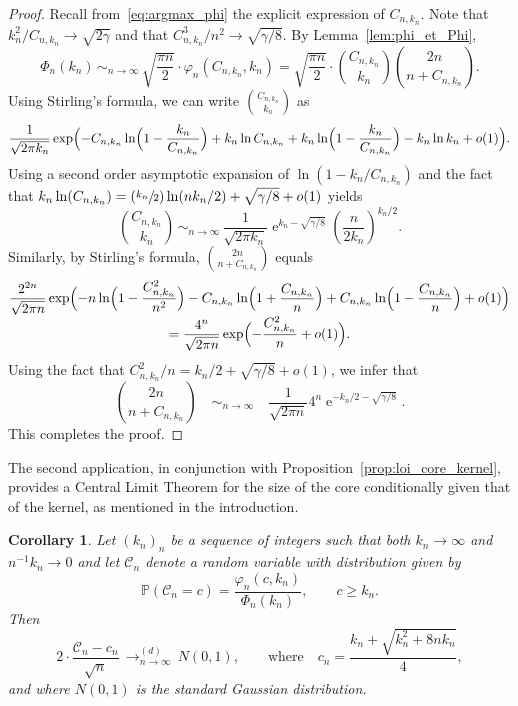 \documentclass[10pt]{amsart}
\newcommand{\Psfrac}[2]{(\sfrac{#1}{#2})}
\theoremstyle{plain}
\newtheorem{corollary}[theorem]{Corollary}
\theoremstyle{definition}
\theoremstyle{remark}
\renewcommand{\P}{\mathbb{P}}
\newcommand{\e}{\operatorname{e}}
\newcommand{\cvloi}[1][n]{\,\mathop{\longrightarrow}^{(d)}_{#1 \to \infty}\,}
\begin{document}
\begin{proof}
Recall from~\eqref{eq:argmax_phi} the explicit expression of $C_{n,k_{n}}$. Note that $k_{n}^{2}/C_{n,k_{n}} \rightarrow \sqrt{2 \gamma}$ and that $C_{n,k_n}^{3}/n^{2} \rightarrow \sqrt{\gamma/8}$. By Lemma~\ref{lem:phi_et_Phi},\vspace*{-3pt}
\[
\Phi_{n}(k_{n}) \, \mathop{\sim}_{n \rightarrow \infty} \, \sqrt{ \frac{\pi n}{2}} \cdot \varphi_{n}(C_{n,k_n},k_n)= \sqrt{ \frac{\pi n}{2}} \cdot \binom{C_{n,k_{n}}}{k_{n}} \binom{2n}{n+C_{n,k_{n}}}.
\]
Using Stirling's formula, we can write $ \binom{C_{n,k_{n}}}{k_{n}}$ as\vspace*{-3pt}
\[
\frac{1}{\sqrt{2 \pi k_{n}}} \exp \Bigl(-C_{n,k_n} \ln \Bigl(1- \frac{k_{n}}{C_{n,k_n}}\Bigr)+ k_{n} \ln C_{n,k_n}+ k_{n} \ln \Bigl(1- \frac{k_{n}}{C_{n,k_n}}\Bigr)-k_{n} \ln k_{n} +o(1) \Bigr).
\]
Using a second order asymptotic expansion of $\ln(1-k_{n}/C_{n,k_n})$ and the fact that $k_{n }\ln(C_{n,k_{n}})= \Psfrac{k_{n}}{2} \ln(n k_{n}/2)+\sqrt{\gamma/8}+o(1)$ yields\vspace*{-3pt}
\[
\binom{C_{n,k_{n}}}{k_{n}} \, \mathop{\sim}_{n \rightarrow \infty} \, \frac{1}{\sqrt{2 \pi k_{n}}} \e^{k_{n}-\sqrt{\gamma/8}} \left(\frac{n}{2 k_{n}}\right)^{k_{n}/2}.
\]
Similarly, by Stirling's formula,
$\binom{2n}{n+C_{n,k_{n}}}$ equals\vspace*{-5pt}
\begin{multline*}
\frac{2^{2n}}{\sqrt{ 2 \pi n}} \exp \Bigl(-n \ln \Bigl(1- \frac{C_{n,k_n}^{2}}{n^{2}} \Bigr)-C_{n,k_n}\ln \Bigl(1+ \frac{C_{n,k_n}}{n} \Bigr) + C_{n,k_n}\ln \Bigl(1- \frac{C_{n,k_n}}{n}\Bigr)+o(1)\Bigr)
\\[-3pt]
= \frac{4^n}{\sqrt{ 2 \pi n}} \exp \Bigl(- \frac{C_{n,k_n}^{2}}{n}+o(1) \Bigr).
\end{multline*}
Using the fact that $C_{n,k_n}^{2}/n=k_{n}/2+ \sqrt{\gamma/8}+o(1)$, we infer that
\[
\binom{2n}{n+C_{n,k_{n}}} \quad \mathop{\sim}_{n \rightarrow \infty} \quad \frac{1}{\sqrt{ 2 \pi n}} 4^{n} \e^{-k_{n}/2-\sqrt{\gamma/8}}.
\]
This completes the proof.
\end{proof}

The second application, in conjunction with Proposition~\ref{prop:loi_core_kernel}, provides a Central Limit Theorem for the size of the core conditionally given that of the kernel, as mentioned in the introduction.

\begin{corollary}\label{cor:TCL_core}
Let $(k_n)_n$ be a sequence of integers such that both $k_n \to \infty$ and $n^{-1} k_n\to0$ and let $\mathcal{C}_{n}$ denote a random variable with distribution given by\vspace*{-3pt}
\[
\P(\mathcal{C}_{n}=c)= \frac{\varphi_{n}(c,k_{n})}{ \Phi_{n}(k_{n})}, \qquad c \geq k_{n}.
\]
Then\vspace*{-3pt}
\[
2 \cdot \frac{ \mathcal{C}_{n}-c_n}{ \sqrt{n}} \cvloi N(0,1),
\qquad\text{where}\quad
c_n = \frac{k_n + \sqrt{k_n^{2} + 8 n k_n }}{4} ,
\]
and where $N(0,1)$ is the standard Gaussian distribution.
\end{corollary}
\end{document}
